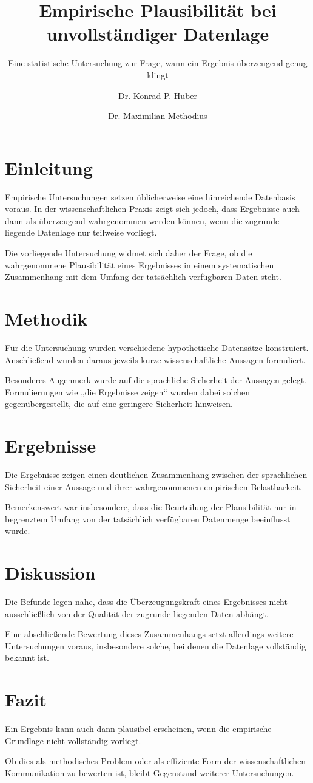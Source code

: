\documentclass{aevidence}
\title{Empirische Plausibilität bei unvollständiger Datenlage}
\subtitle{Eine statistische Untersuchung zur Frage, wann ein Ergebnis überzeugend genug klingt}
\author{
  Dr. Konrad P. Huber
  \and
  Dr. Maximilian Methodius
}
\begin{document}
\section{Einleitung}

Empirische Untersuchungen setzen üblicherweise eine hinreichende Datenbasis
voraus. In der wissenschaftlichen Praxis zeigt sich jedoch, dass Ergebnisse
auch dann als überzeugend wahrgenommen werden können, wenn die zugrunde
liegende Datenlage nur teilweise vorliegt.

Die vorliegende Untersuchung widmet sich daher der Frage, ob die
wahrgenommene Plausibilität eines Ergebnisses in einem systematischen
Zusammenhang mit dem Umfang der tatsächlich verfügbaren Daten steht.

\section{Methodik}

Für die Untersuchung wurden verschiedene hypothetische Datensätze
konstruiert. Anschließend wurden daraus jeweils kurze wissenschaftliche
Aussagen formuliert.

Besonderes Augenmerk wurde auf die sprachliche Sicherheit der Aussagen
gelegt. Formulierungen wie „die Ergebnisse zeigen“ wurden dabei solchen
gegenübergestellt, die auf eine geringere Sicherheit hinweisen.

\section{Ergebnisse}

Die Ergebnisse zeigen einen deutlichen Zusammenhang zwischen der
sprachlichen Sicherheit einer Aussage und ihrer wahrgenommenen empirischen
Belastbarkeit.

Bemerkenswert war insbesondere, dass die Beurteilung der Plausibilität nur
in begrenztem Umfang von der tatsächlich verfügbaren Datenmenge beeinflusst
wurde.

\section{Diskussion}

Die Befunde legen nahe, dass die Überzeugungskraft eines Ergebnisses nicht
ausschließlich von der Qualität der zugrunde liegenden Daten abhängt.

Eine abschließende Bewertung dieses Zusammenhangs setzt allerdings weitere
Untersuchungen voraus, insbesondere solche, bei denen die Datenlage
vollständig bekannt ist.

\section{Fazit}

Ein Ergebnis kann auch dann plausibel erscheinen, wenn die empirische
Grundlage nicht vollständig vorliegt.

Ob dies als methodisches Problem oder als effiziente Form der
wissenschaftlichen Kommunikation zu bewerten ist, bleibt Gegenstand
weiterer Untersuchungen.
\end{document}
